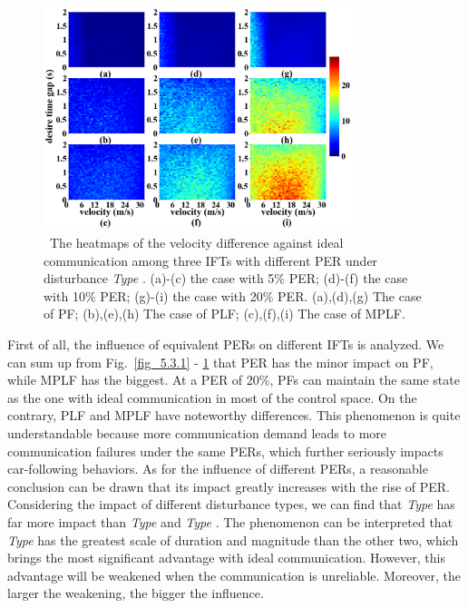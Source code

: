 \documentclass[journal]{IEEEtran}
\begin{document}
\begin{figure}
  \includegraphics[width=9cm]{fig_5.3.3.png}
  \caption{~The heatmaps of the velocity difference against ideal communication among three IFTs with different PER under disturbance \textit{Type \uppercase\expandafter{}}. (a)-(c) the case with 5\% PER; (d)-(f) the case with 10\% PER; (g)-(i) the case with 20\% PER. (a),(d),(g) The case of PF; (b),(e),(h) The case of PLF; (c),(f),(i) The case of MPLF.}
  \label{fig_5.3.3}
\end{figure}



First of all, the influence of equivalent PERs on different IFTs is analyzed. We can sum up from Fig.~\ref{fig_5.3.1} - \ref{fig_5.3.3} that PER has the minor impact on PF, while MPLF has the biggest. At a PER of 20\%, PFs can maintain the same state as the one with ideal communication in most of the control space. On the contrary, PLF and MPLF have noteworthy differences. This phenomenon is quite understandable because more communication demand leads to more communication failures under the same PERs, which further seriously impacts car-following behaviors. As for the influence of different PERs, a reasonable conclusion can be drawn that its impact greatly increases with the rise of PER. Considering the impact of different disturbance types, we can find that \textit{Type \uppercase\expandafter{}} has far more impact than \textit{Type \uppercase\expandafter{}} and \textit{Type \uppercase\expandafter{}}. The phenomenon can be interpreted that \textit{Type \uppercase\expandafter{}} has the greatest scale of duration and magnitude than the other two, which brings the most significant advantage with ideal communication. However, this advantage will be weakened when the communication is unreliable. Moreover, the larger the weakening, the bigger the influence.
\end{document}
